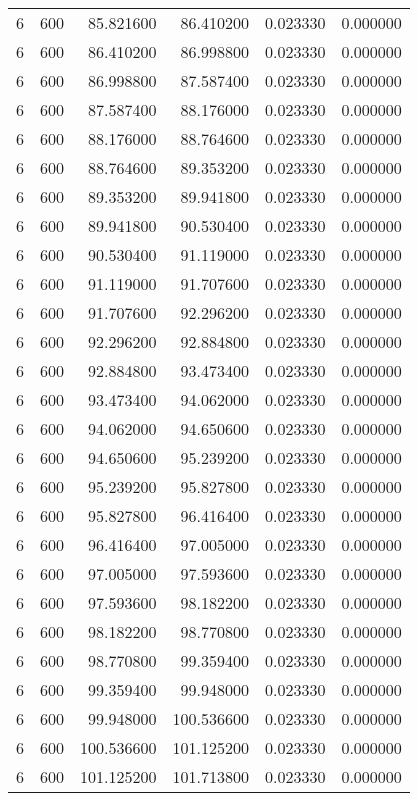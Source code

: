 \begin{longtable}{rrrrrr}
6 & 600 & 85.821600 & 86.410200 & 0.023330 & 0.000000 \\
6 & 600 & 86.410200 & 86.998800 & 0.023330 & 0.000000 \\
6 & 600 & 86.998800 & 87.587400 & 0.023330 & 0.000000 \\
6 & 600 & 87.587400 & 88.176000 & 0.023330 & 0.000000 \\
6 & 600 & 88.176000 & 88.764600 & 0.023330 & 0.000000 \\
6 & 600 & 88.764600 & 89.353200 & 0.023330 & 0.000000 \\
6 & 600 & 89.353200 & 89.941800 & 0.023330 & 0.000000 \\
6 & 600 & 89.941800 & 90.530400 & 0.023330 & 0.000000 \\
6 & 600 & 90.530400 & 91.119000 & 0.023330 & 0.000000 \\
6 & 600 & 91.119000 & 91.707600 & 0.023330 & 0.000000 \\
6 & 600 & 91.707600 & 92.296200 & 0.023330 & 0.000000 \\
6 & 600 & 92.296200 & 92.884800 & 0.023330 & 0.000000 \\
6 & 600 & 92.884800 & 93.473400 & 0.023330 & 0.000000 \\
6 & 600 & 93.473400 & 94.062000 & 0.023330 & 0.000000 \\
6 & 600 & 94.062000 & 94.650600 & 0.023330 & 0.000000 \\
6 & 600 & 94.650600 & 95.239200 & 0.023330 & 0.000000 \\
6 & 600 & 95.239200 & 95.827800 & 0.023330 & 0.000000 \\
6 & 600 & 95.827800 & 96.416400 & 0.023330 & 0.000000 \\
6 & 600 & 96.416400 & 97.005000 & 0.023330 & 0.000000 \\
6 & 600 & 97.005000 & 97.593600 & 0.023330 & 0.000000 \\
6 & 600 & 97.593600 & 98.182200 & 0.023330 & 0.000000 \\
6 & 600 & 98.182200 & 98.770800 & 0.023330 & 0.000000 \\
6 & 600 & 98.770800 & 99.359400 & 0.023330 & 0.000000 \\
6 & 600 & 99.359400 & 99.948000 & 0.023330 & 0.000000 \\
6 & 600 & 99.948000 & 100.536600 & 0.023330 & 0.000000 \\
6 & 600 & 100.536600 & 101.125200 & 0.023330 & 0.000000 \\
6 & 600 & 101.125200 & 101.713800 & 0.023330 & 0.000000 \\

\end{longtable}
